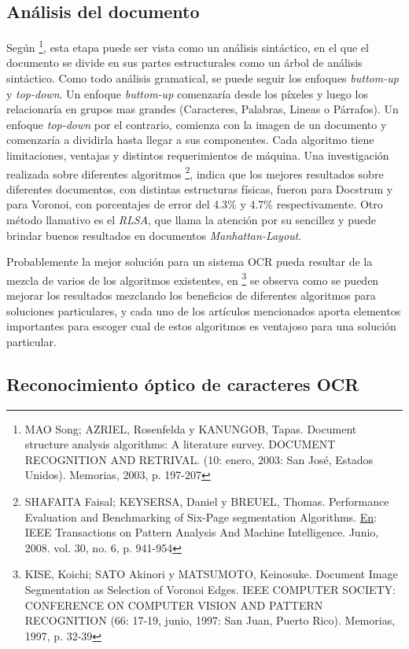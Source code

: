\documentclass[a4paper, 11pt, oneside]{report}
\begin{document}
\subsection{Análisis del documento}

Según \footnote{MAO Song; AZRIEL, Rosenfelda y KANUNGOB, Tapas. Document structure analysis algorithms: A literature survey. DOCUMENT RECOGNITION AND RETRIVAL. (10: enero, 2003: San José, Estados Unidos).  Memorias, 2003, p. 197-207}, esta etapa puede ser vista como un análisis sintáctico, en el que el documento se divide en sus partes estructurales como un árbol de análisis sintáctico. Como todo análisis gramatical, se puede seguir los enfoques \textit{buttom-up} y \textit{top-down}. Un enfoque \textit{buttom-up} comenzaría desde los píxeles y luego los relacionaría en grupos mas grandes (Caracteres, Palabras, Lineas o Párrafos). Un enfoque \textit{top-down} por el contrario, comienza con la imagen de un documento y comenzaría a dividirla hasta llegar a sus componentes. Cada algoritmo tiene limitaciones, ventajas y distintos requerimientos de máquina. Una investigación realizada sobre diferentes algoritmos \footnote{SHAFAITA Faisal; KEYSERSA,  Daniel y BREUEL, Thomas. Performance Evaluation and Benchmarking of Six-Page segmentation Algorithms. \underline{En}: IEEE Transactions on Pattern Analysis And Machine Intelligence.  Junio, 2008. vol. 30, no. 6, p. 941-954}, indica que los mejores resultados sobre diferentes documentos, con distintas estructuras físicas, fueron para Docstrum y para Voronoi, con porcentajes de error del 4.3\% y 4.7\% respectivamente. Otro método	llamativo es el \textit{RLSA}, que llama  la atención por su sencillez y puede brindar buenos resultados en documentos \textit{Manhattan-Layout}. 

Probablemente la mejor solución para un sistema OCR pueda resultar de la mezcla de varios de los algoritmos existentes, en \footnote{KISE, Koichi; SATO Akinori y MATSUMOTO,  Keinosuke. Document Image Segmentation as Selection of Voronoi Edges. IEEE COMPUTER SOCIETY: CONFERENCE ON COMPUTER VISION AND PATTERN RECOGNITION (66: 17-19, junio, 1997: San Juan,  Puerto Rico). Memorias, 1997, p. 32-39} se observa como se pueden mejorar los resultados  mezclando los beneficios de diferentes algoritmos para soluciones particulares, y cada uno de los artículos mencionados aporta elementos importantes para escoger cual de estos algoritmos  es ventajoso para una solución particular.  

\subsection{Reconocimiento óptico de caracteres OCR}
\end{document}
